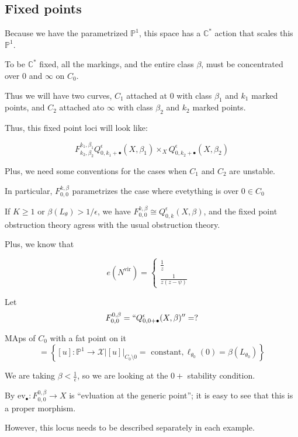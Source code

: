 \documentclass{amsart}
\theoremstyle{definition}
\newcommand{\proj}{\mathbb{P}}
\newcommand{\C}{\mathbb{C}}
\newcommand{\ev}{\text{ev}}
\newcommand{\vir}{\text{vir}}
\begin{document}
\subsection{Fixed points}
Because we have the parametrized $\proj^1$, this space has a $\C^*$ action that scales this $\proj^1$.

To be $\C^*$ fixed, all the markings, and the entire class $\beta$, must be concentrated over $0$ and $\infty$ on $C_0$.

Thus we will have two curves, $C_1$ attached at $0$ with class $\beta_1$ and $k_1$ marked points, and $C_2$ attached ato $\infty$ with class $\beta_2$ and $k_2$ marked points.

Thus, this fixed point loci will look like:

$$F^{k_1,\beta_1}_{k_2,\beta_2} Q^\epsilon_{0,k_1+\bullet}(X,\beta_1)\times_X Q^\epsilon_{0,k_2+\bullet}(X,\beta_2)$$

Plus, we need some conventions for the cases when $C_1$ and $C_2$ are unstable.

In particular, $F_{0,0}^{k,\beta}$ parametrizes the case where evetything is over $0\in C_0$

If $K\geq 1$ or $\beta(L_\theta)>1/\epsilon$, we have $F_{0,0}^{k,\beta}\cong Q^\epsilon_{0,k}(X,\beta)$, and the fixed point obstruction theory agress with the usual obstruction theory.

Plus, we know that

$$e(N^\vir)=\left\{\begin{array}{ll} \frac{1}{z} & \\ \frac{1}{z(z-\psi)} & \end{array}\right.$$

Let $$F_{0,0}^{0,\beta}=``Q^\epsilon_{0,0+\bullet}(X,\beta)''=?$$


MAps of $C_0$ with a fat point on it 
$$=\left\{ [u]:\proj^1\to \mathcal{X} | [u]|_{C_0\setminus 0}=\text{ constant}, \ell_{\theta_0}(0)=\beta(L_{\theta_0})\right\}$$

We are taking $\beta<\frac{1}{\epsilon}$, so we are looking at the $0+$ stability condition.

By $\ev_\bullet:F^{0,\beta}_{0,0}\to X$ is ``evluation at the generic point''; it is easy to see that this is a proper morphism.

However, this locus needs to be described separately in each example.
\end{document}
